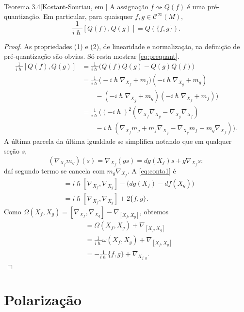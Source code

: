 \begin{thing5}{Teorema 3.4}[Kostant-Souriau, em \cite{wang}]\leavevmode
A assignação $f \rightsquigarrow Q(f)$ é uma pré-quantização. Em particular, para quaisquer $f,g \in \mathcal{C}^\infty(M)$,
\begin{equation}\label{eq:prequant}\frac{1}{i\hslash}[Q(f),Q(g)]=Q(\{f,g\}).
\end{equation}
\end{thing5}

\begin{proof}\leavevmode
As propriedades (1) e (2), de linearidade e normalização, na definição de pré-quantização são obvias. Só resta mostrar  \cref{eq:prequant}.
\begin{equation}\label{eq:conta1}
\begin{aligned}
	\frac{1}{i \hslash}[Q(f),Q(g)]&=\frac{1}{i \hslash}\Big(Q(f)Q(g)-Q(g)Q(f)\Big)\\
	&=\frac{1}{i \hslash}\Big(-i \hslash \nabla_{X_f}+ m_f)(-i \hslash \nabla_{X_g}+m_g)\\& \qquad -(-i \hslash \nabla_{X_g}+m_g)(-i \hslash \nabla_{X_f}+m_f) \Big)\\
	&=\frac{1}{i \hslash} \Big( (-i \hslash)^2(\nabla_{X_f}\nabla_{X_g}-\nabla_{X_g}\nabla_{X_f})\\& \qquad -i\hslash (\nabla_{X_f}m_g+m_f \nabla_{X_g}-\nabla_{X_g}m_f-m_g\nabla_{X_f}) \Big).
	\end{aligned}	\end{equation}
A última parcela da última igualdade se simplifica notando que em qualquer seção $s$,
\[\left(\nabla_{X_f}m_g\right)(s)=\nabla_{X_f}(gs)=dg(X_f)s+g\nabla_{X_f}s;\]
daí segundo termo se cancela com $m_{g}\nabla_{X_f}$. A \cref{eq:conta1} é
\begin{align*}
&=i \hslash [\nabla_{X_f},\nabla_{X_{g}}]-\Big(dg(X_f)-df(X_g) \Big)\\
&=i \hslash [\nabla_{X_f},\nabla_{X_g}]+2\{f,g\}.
\end{align*}
Como $\Omega(X_f,X_g)=[\nabla_{X_f},\nabla_{X_g}]-\nabla_{[X_{f},X_g]}$, obtemos
\begin{align*}[\nabla_{X_f},\nabla_{X_g}]&=\Omega(X_f,X_g)+\nabla_{[X_f,X_g]}\\
	&=\frac{1}{i \hslash}\omega(X_f,X_g)+\nabla_{[X_f,X_g]}\\
	&=-\frac{1}{i \hslash}\{f,g\}+\nabla_{X_{f,g}}.
\end{align*}
\end{proof}

\iffalse
\section{Polarização}

